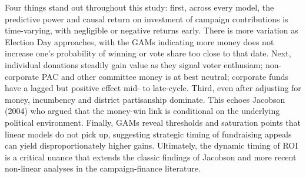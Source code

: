 \indent Four things stand out throughout this study: first, across every model, the predictive power and causal return on investment of campaign contributions is time-varying, with negligible or negative returns early. There is more variation as Election Day approaches, with the GAMs indicating more money does not increase one's probability of winning or vote share too close to that date. Next, individual donations steadily gain value as they signal voter enthusiam; non-corporate PAC and other committee money is at best neutral; corporate funds have a lagged but positive effect mid- to late-cycle. Third, even after adjusting for money, incumbency and district partisanship dominate. This echoes Jacobson (2004) who argued that the money-win link is conditional on the underlying political environment. Finally, GAMs reveal thresholds and saturation points that linear models do not pick up, suggesting strategic timing of fundraising appeals can yield disproportionately higher gains. Ultimately, the dynamic timing of ROI is a critical nuance that extends the classic findings of Jacobson and more recent non-linear analyses in the campaign-finance literature.
